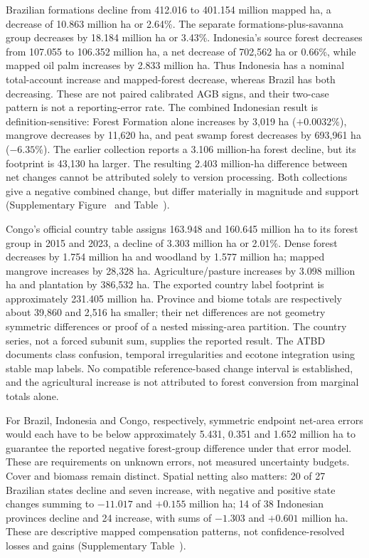 \documentclass[11pt,a4paper]{article}
\begin{document}
Brazilian formations decline from 412.016 to 401.154 million mapped ha, a decrease of 10.863 million ha or 2.64\%. The separate formations-plus-savanna group decreases by 18.184 million ha or 3.43\%. Indonesia's source forest decreases from 107.055 to 106.352 million ha, a net decrease of 702,562 ha or 0.66\%, while mapped oil palm increases by 2.833 million ha. Thus Indonesia has a nominal total-account increase and mapped-forest decrease, whereas Brazil has both decreasing. These are not paired calibrated AGB signs, and their two-case pattern is not a reporting-error rate. The combined Indonesian result is definition-sensitive: Forest Formation alone increases by 3,019 ha ($+0.0032\%$), mangrove decreases by 11,620 ha, and peat swamp forest decreases by 693,961 ha ($-6.35\%$). The earlier collection reports a 3.106 million-ha forest decline, but its footprint is 43,130 ha larger. The resulting 2.403 million-ha difference between net changes cannot be attributed solely to version processing. Both collections give a negative combined change, but differ materially in magnitude and support (Supplementary Figure~ and Table~).

Congo's official country table assigns 163.948 and 160.645 million ha to its forest group in 2015 and 2023, a decline of 3.303 million ha or 2.01\%. Dense forest decreases by 1.754 million ha and woodland by 1.577 million ha; mapped mangrove increases by 28,328 ha. Agriculture/pasture increases by 3.098 million ha and plantation by 386,532 ha. The exported country label footprint is approximately 231.405 million ha. Province and biome totals are respectively about 39,860 and 2,516 ha smaller; their net differences are not geometry symmetric differences or proof of a nested missing-area partition. The country series, not a forced subunit sum, supplies the reported result. The ATBD documents class confusion, temporal irregularities and ecotone integration using stable map labels. No compatible reference-based change interval is established, and the agricultural increase is not attributed to forest conversion from marginal totals alone.

For Brazil, Indonesia and Congo, respectively, symmetric endpoint net-area errors would each have to be below approximately 5.431, 0.351 and 1.652 million ha to guarantee the reported negative forest-group difference under that error model. These are requirements on unknown errors, not measured uncertainty budgets. Cover and biomass remain distinct. Spatial netting also matters: 20 of 27 Brazilian states decline and seven increase, with negative and positive state changes summing to $-11.017$ and $+0.155$ million ha; 14 of 38 Indonesian provinces decline and 24 increase, with sums of $-1.303$ and $+0.601$ million ha. These are descriptive mapped compensation patterns, not confidence-resolved losses and gains (Supplementary Table~).
\end{document}
